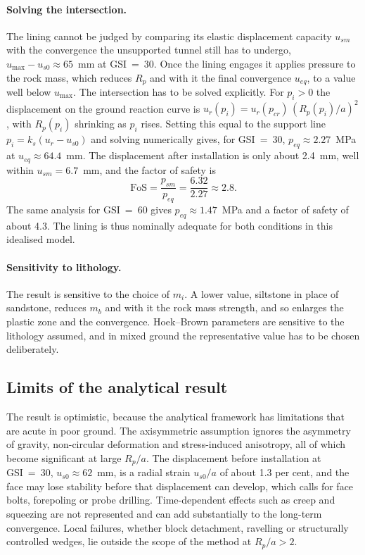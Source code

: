 \paragraph{Solving the intersection.}
The lining cannot be judged by comparing its elastic displacement capacity
$u_{sm}$ with the convergence the unsupported tunnel still has to undergo,
$u_{\max} - u_{s0} \approx 65$~mm at GSI~=~30. Once the lining engages it
applies pressure to the rock mass, which reduces $R_p$ and with it the final
convergence $u_{eq}$, to a value well below $u_{\max}$. The intersection has
to be solved explicitly. For $p_i > 0$ the displacement on the ground
reaction curve is $u_r(p_i) = u_r(p_{cr})\,(R_p(p_i)/a)^2$, with $R_p(p_i)$
shrinking as $p_i$ rises. Setting this equal to the support line
$p_i = k_s(u_r - u_{s0})$ and solving numerically gives, for GSI~=~30,
$p_{eq} \approx 2.27$~MPa at $u_{eq} \approx 64.4$~mm. The displacement after
installation is only about 2.4~mm, well within $u_{sm} = 6.7$~mm, and the
factor of safety is
\[
\mathrm{FoS} = \frac{p_{sm}}{p_{eq}} = \frac{6.32}{2.27} \approx 2.8 .
\]
The same analysis for GSI~=~60 gives $p_{eq} \approx 1.47$~MPa and a factor
of safety of about 4.3. The lining is thus nominally adequate for both
conditions in this idealised model.

\paragraph{Sensitivity to lithology.}
The result is sensitive to the choice of $m_i$. A lower value, siltstone in place of sandstone,
reduces $m_b$ and with it the rock mass strength, and so enlarges the plastic
zone and the convergence. Hoek--Brown parameters are sensitive to the
lithology assumed, and in mixed ground the representative value has to be
chosen deliberately.

\subsection{Limits of the analytical result}
\label{sec:ccm-limits}

The result is optimistic, because the analytical framework has limitations
that are acute in poor ground. The axisymmetric assumption ignores the
asymmetry of gravity, non-circular deformation and stress-induced anisotropy,
all of which become significant at large $R_p/a$. The displacement before
installation at GSI~=~30, $u_{s0} \approx 62$~mm, is a radial strain
$u_{s0}/a$ of about 1.3 per cent, and the face may lose stability before that
displacement can develop, which calls for face bolts, forepoling or probe
drilling. Time-dependent effects such as creep and squeezing are not
represented and can add substantially to the long-term convergence.
Local failures, whether block detachment, ravelling or structurally
controlled wedges, lie outside the scope of the method at $R_p/a > 2$.

